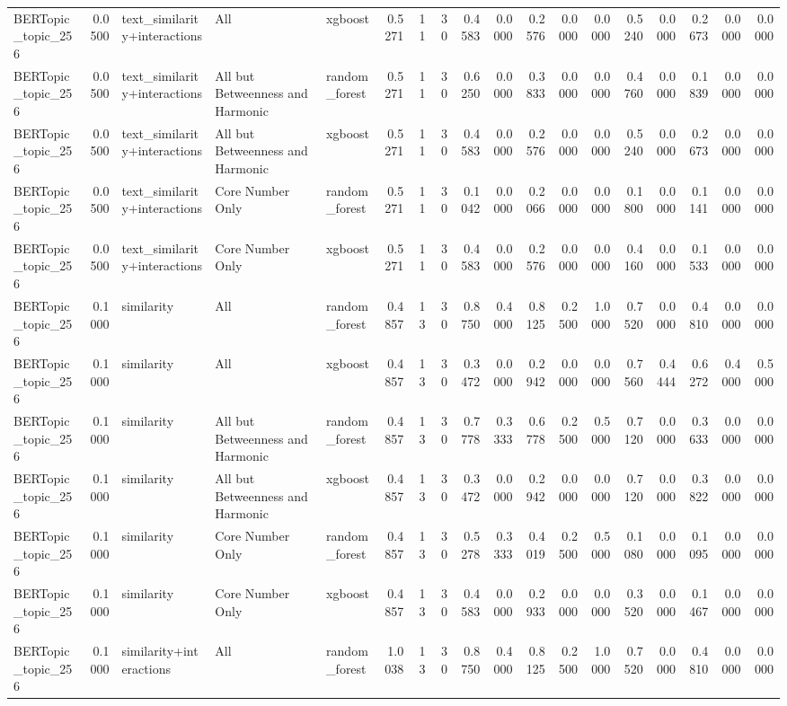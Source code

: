 \begin{tabular}{lrlllrrrrrrrrrrrrr}
BERTopic_topic_256 & 0.0500 & text_similarity+interactions & All & xgboost & 0.5271 & 11 & 30 & 0.4583 & 0.0000 & 0.2576 & 0.0000 & 0.0000 & 0.5240 & 0.0000 & 0.2673 & 0.0000 & 0.0000 \\
BERTopic_topic_256 & 0.0500 & text_similarity+interactions & All but Betweenness and Harmonic & random_forest & 0.5271 & 11 & 30 & 0.6250 & 0.0000 & 0.3833 & 0.0000 & 0.0000 & 0.4760 & 0.0000 & 0.1839 & 0.0000 & 0.0000 \\
BERTopic_topic_256 & 0.0500 & text_similarity+interactions & All but Betweenness and Harmonic & xgboost & 0.5271 & 11 & 30 & 0.4583 & 0.0000 & 0.2576 & 0.0000 & 0.0000 & 0.5240 & 0.0000 & 0.2673 & 0.0000 & 0.0000 \\
BERTopic_topic_256 & 0.0500 & text_similarity+interactions & Core Number Only & random_forest & 0.5271 & 11 & 30 & 0.1042 & 0.0000 & 0.2066 & 0.0000 & 0.0000 & 0.1800 & 0.0000 & 0.1141 & 0.0000 & 0.0000 \\
BERTopic_topic_256 & 0.0500 & text_similarity+interactions & Core Number Only & xgboost & 0.5271 & 11 & 30 & 0.4583 & 0.0000 & 0.2576 & 0.0000 & 0.0000 & 0.4160 & 0.0000 & 0.1533 & 0.0000 & 0.0000 \\
BERTopic_topic_256 & 0.1000 & similarity & All & random_forest & 0.4857 & 13 & 30 & 0.8750 & 0.4000 & 0.8125 & 0.2500 & 1.0000 & 0.7520 & 0.0000 & 0.4810 & 0.0000 & 0.0000 \\
BERTopic_topic_256 & 0.1000 & similarity & All & xgboost & 0.4857 & 13 & 30 & 0.3472 & 0.0000 & 0.2942 & 0.0000 & 0.0000 & 0.7560 & 0.4444 & 0.6272 & 0.4000 & 0.5000 \\
BERTopic_topic_256 & 0.1000 & similarity & All but Betweenness and Harmonic & random_forest & 0.4857 & 13 & 30 & 0.7778 & 0.3333 & 0.6778 & 0.2500 & 0.5000 & 0.7120 & 0.0000 & 0.3633 & 0.0000 & 0.0000 \\
BERTopic_topic_256 & 0.1000 & similarity & All but Betweenness and Harmonic & xgboost & 0.4857 & 13 & 30 & 0.3472 & 0.0000 & 0.2942 & 0.0000 & 0.0000 & 0.7120 & 0.0000 & 0.3822 & 0.0000 & 0.0000 \\
BERTopic_topic_256 & 0.1000 & similarity & Core Number Only & random_forest & 0.4857 & 13 & 30 & 0.5278 & 0.3333 & 0.4019 & 0.2500 & 0.5000 & 0.1080 & 0.0000 & 0.1095 & 0.0000 & 0.0000 \\
BERTopic_topic_256 & 0.1000 & similarity & Core Number Only & xgboost & 0.4857 & 13 & 30 & 0.4583 & 0.0000 & 0.2933 & 0.0000 & 0.0000 & 0.3520 & 0.0000 & 0.1467 & 0.0000 & 0.0000 \\
BERTopic_topic_256 & 0.1000 & similarity+interactions & All & random_forest & 1.0038 & 13 & 30 & 0.8750 & 0.4000 & 0.8125 & 0.2500 & 1.0000 & 0.7520 & 0.0000 & 0.4810 & 0.0000 & 0.0000 \\

\end{tabular}
